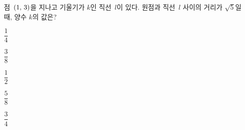 점~$(1,\mkern3mu 3)$을 지나고 기울기가 $k$인 직선~$l$이 있다. 원점과 직선~$l$ 사이의 거리가 $\sqrt{5}$일 때, 양수 $k$의 값은?
\begin{choices32}{\rule[-3ex]{0pt}{8ex}$\dfrac{1}{4}$}{\rule[-3ex]{0pt}{8ex}$\dfrac{3}{8}$}{\rule[-3ex]{0pt}{8ex}$\dfrac{1}{2}$}{\rule[-3ex]{0pt}{8ex}$\dfrac{5}{8}$}{\rule[-3ex]{0pt}{8ex}$\dfrac{3}{4}$}\end{choices32}
